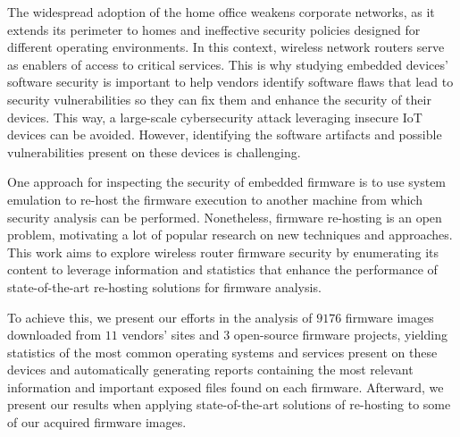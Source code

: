 The widespread adoption of the home office weakens corporate networks, as it extends its perimeter to homes and ineffective security policies designed for different operating environments. In this context, wireless network routers serve as enablers of access to critical services. This is why studying embedded devices' software security is important to help vendors identify software flaws that lead to security vulnerabilities so they can fix them and enhance the security of their devices. This way, a large-scale cybersecurity attack leveraging insecure IoT devices can be avoided. However, identifying the software artifacts and possible vulnerabilities present on these devices is challenging. 

One approach for inspecting the security of embedded firmware is to use system emulation to re-host the firmware execution to another machine from which security analysis can be performed. Nonetheless, firmware re-hosting is an open problem, motivating a lot of popular research on new techniques and approaches. This work aims to explore wireless router firmware security by enumerating its content to leverage information and statistics that enhance the performance of state-of-the-art re-hosting solutions for firmware analysis.

To achieve this, we present our efforts in the analysis of $9176$ firmware images downloaded from $11$ vendors' sites and $3$ open-source firmware projects, yielding statistics of the most common operating systems and services present on these devices and automatically generating reports containing the most relevant information and important exposed files found on each firmware. Afterward, we present our results when applying state-of-the-art solutions of re-hosting to some of our acquired firmware images.


